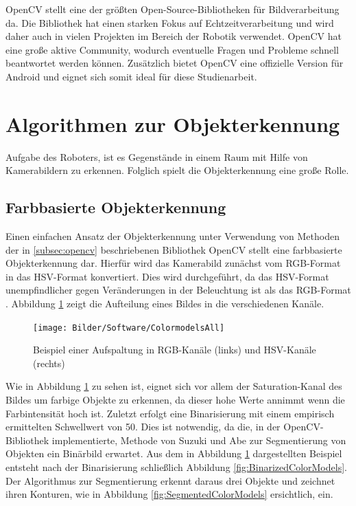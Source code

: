 OpenCV \cite{opencv_library, bradski2008learning} stellt eine der größten Open-Source-Bibliotheken für Bildverarbeitung da. Die Bibliothek hat einen starken Fokus auf Echtzeitverarbeitung und wird daher auch in vielen Projekten im Bereich der Robotik verwendet. OpenCV hat eine große aktive Community, wodurch eventuelle Fragen und Probleme schnell beantwortet werden können. Zusätzlich bietet OpenCV eine offizielle Version für Android und eignet sich somit ideal für diese Studienarbeit.


\section{Algorithmen zur Objekterkennung}
\label{sec:Objekterkennung}

Aufgabe des Roboters, ist es Gegenstände in einem Raum mit Hilfe von Kamerabildern zu erkennen. Folglich spielt die Objekterkennung eine große Rolle.

\subsection{Farbbasierte Objekterkennung}
Einen einfachen Ansatz der Objekterkennung unter Verwendung von Methoden der in \ref{subsec:opencv} beschriebenen Bibliothek OpenCV stellt eine farbbasierte Objekterkennung dar. Hierfür wird das Kamerabild zunächst vom RGB-Format in das HSV-Format konvertiert. Dies wird durchgeführt, da das HSV-Format unempfindlicher gegen Veränderungen in der Beleuchtung ist als das RGB-Format \cite{cucchiara2001improving}. Abbildung \ref{fig:ColorModels} zeigt die Aufteilung eines Bildes in die verschiedenen Kanäle.

\begin{figure}[h]
\centering
\texttt{[image: Bilder/Software/ColormodelsAll]}
\caption{Beispiel einer Aufspaltung in RGB-Kanäle (links) und HSV-Kanäle (rechts)}
\label{fig:ColorModels}
\end{figure}

Wie in Abbildung \ref{fig:ColorModels} zu sehen ist, eignet sich vor allem der Saturation-Kanal des Bildes um farbige Objekte zu erkennen, da dieser hohe Werte annimmt wenn die Farbintensität hoch ist. Zuletzt erfolgt eine Binarisierung mit einem empirisch ermittelten Schwellwert von 50. Dies ist notwendig, da die, in der OpenCV-Bibliothek implementierte, Methode von Suzuki und Abe \cite{suzuki1985topological} zur Segmentierung von Objekten ein Binärbild erwartet. Aus dem in Abbildung \ref{fig:ColorModels} dargestellten Beispiel entsteht nach der Binarisierung schließlich Abbildung \ref{fig:BinarizedColorModels}. Der Algorithmus zur Segmentierung erkennt daraus drei Objekte und zeichnet ihren Konturen, wie in Abbildung \ref{fig:SegmentedColorModels} ersichtlich, ein.

